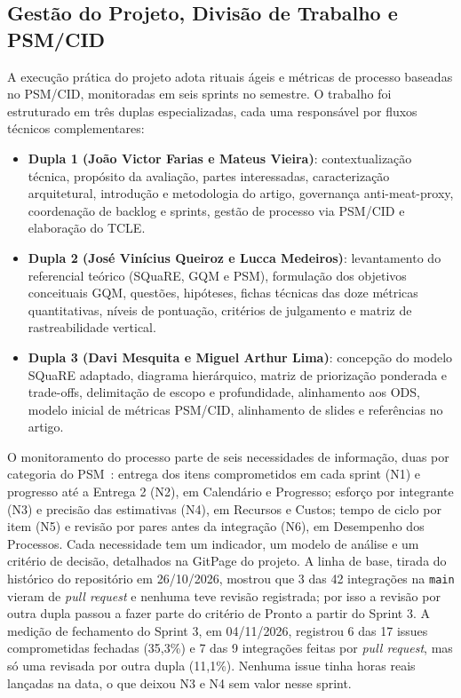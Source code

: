 \documentclass[journal]{IEEEtran}
\begin{document}
\subsection{Gestão do Projeto, Divisão de Trabalho e PSM/CID}
\label{sec:gestao_psm}

A execução prática do projeto adota rituais ágeis e métricas de processo baseadas no PSM/CID, monitoradas em seis sprints no semestre. O trabalho foi estruturado em três duplas especializadas, cada uma responsável por fluxos técnicos complementares:

\begin{itemize}
    \item \textbf{Dupla 1 (João Victor Farias e Mateus Vieira)}: contextualização técnica, propósito da avaliação, partes interessadas, caracterização arquitetural, introdução e metodologia do artigo, governança anti-meat-proxy, coordenação de backlog e sprints, gestão de processo via PSM/CID e elaboração do TCLE.
    \item \textbf{Dupla 2 (José Vinícius Queiroz e Lucca Medeiros)}: levantamento do referencial teórico (SQuaRE, GQM e PSM), formulação dos objetivos conceituais GQM, questões, hipóteses, fichas técnicas das doze métricas quantitativas, níveis de pontuação, critérios de julgamento e matriz de rastreabilidade vertical.
    \item \textbf{Dupla 3 (Davi Mesquita e Miguel Arthur Lima)}: concepção do modelo SQuaRE adaptado, diagrama hierárquico, matriz de priorização ponderada e trade-offs, delimitação de escopo e profundidade, alinhamento aos ODS, modelo inicial de métricas PSM/CID, alinhamento de slides e referências no artigo.
\end{itemize}

O monitoramento do processo parte de seis necessidades de informação, duas por categoria do PSM~\cite{mcgarry2002psm}: entrega dos itens comprometidos em cada sprint (N1) e progresso até a Entrega 2 (N2), em Calendário e Progresso; esforço por integrante (N3) e precisão das estimativas (N4), em Recursos e Custos; tempo de ciclo por item (N5) e revisão por pares antes da integração (N6), em Desempenho dos Processos. Cada necessidade tem um indicador, um modelo de análise e um critério de decisão, detalhados na GitPage do projeto. A linha de base, tirada do histórico do repositório em 26/10/2026, mostrou que 3 das 42 integrações na \texttt{main} vieram de \textit{pull request} e nenhuma teve revisão registrada; por isso a revisão por outra dupla passou a fazer parte do critério de Pronto a partir do Sprint 3. A medição de fechamento do Sprint 3, em 04/11/2026, registrou 6 das 17 issues comprometidas fechadas (35,3\%) e 7 das 9 integrações feitas por \textit{pull request}, mas só uma revisada por outra dupla (11,1\%). Nenhuma issue tinha horas reais lançadas na data, o que deixou N3 e N4 sem valor nesse sprint.
\end{document}
